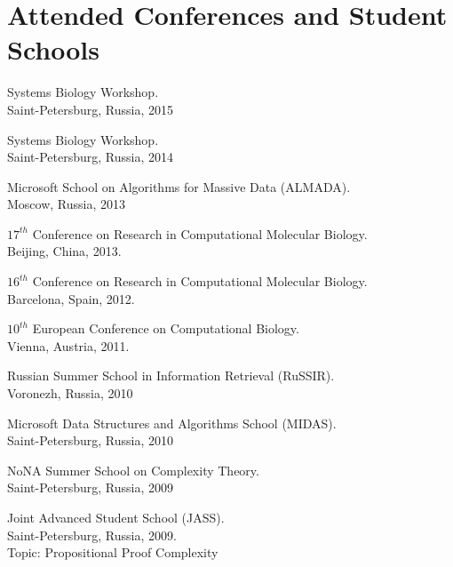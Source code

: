 \section{Attended Conferences and Student Schools}
%
\begin{innerlist}

\item Systems Biology Workshop. \\
Saint-Petersburg, Russia, 2015

\item Systems Biology Workshop. \\
Saint-Petersburg, Russia, 2014

\item Microsoft School on Algorithms for Massive Data (ALMADA). \\
Moscow, Russia, 2013

\item $17^{th}$ Conference on Research in Computational Molecular Biology.\\ 
Beijing, China, 2013.

\item $16^{th}$ Conference on Research in Computational Molecular Biology.\\ 
Barcelona, Spain, 2012.

\item $10^{th}$ European Conference on Computational Biology.\\ 
Vienna, Austria, 2011.

\item Russian Summer School in Information Retrieval (RuSSIR).\\ 
Voronezh, Russia, 2010

\item Microsoft Data Structures and Algorithms School (MIDAS).\\ 
Saint-Petersburg, Russia, 2010

\item NoNA Summer School on Complexity Theory.\\
Saint-Petersburg, Russia, 2009

\item Joint Advanced Student School (JASS).\\
Saint-Petersburg, Russia, 2009.\\ 
Topic: Propositional Proof Complexity

\end{innerlist}
